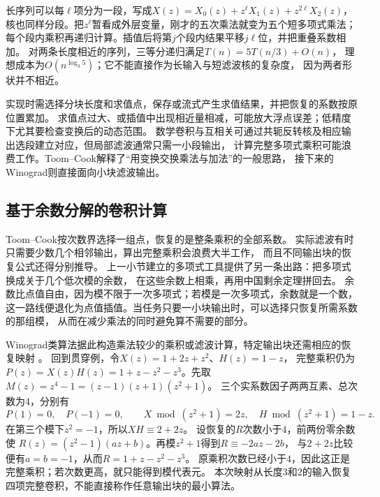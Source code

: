 长序列可以每$\ell$项分为一段，写成$X(z)=X_0(z)+z^\ell X_1(z)+z^{2\ell}X_2(z)$，
核也同样分段。把$z^\ell$暂看成外层变量，刚才的五次乘法就变为五个短多项式乘法；
每个段内乘积再递归计算。插值后将第$j$个段内结果平移$j\ell$位，并把重叠系数相加。
对两条长度相近的序列，三等分递归满足$T(n)=5T(n/3)+O(n)$，
理想成本为$O(n^{\log_3 5})$；它不能直接作为长输入与短滤波核的复杂度，
因为两者形状并不相近。

实现时需选择分块长度和求值点，保存或流式产生求值结果，并把恢复的系数按原位置累加。
求值点过大、或插值中出现相近量相减，可能放大浮点误差；低精度下尤其要检查变换后的动态范围。
数学卷积与互相关可通过共轭反转核及相应输出选段建立对应，但局部滤波通常只需一小段输出，
计算完整多项式乘积可能浪费工作。Toom--Cook解释了“用变换交换乘法与加法”的一般思路，
接下来的Winograd则直接面向小块滤波输出。

\subsection{基于余数分解的卷积计算}\label{sec:signal-analysis-fast-winograd}\label{sec:cnn-winograd}

Toom--Cook按次数界选择一组点，恢复的是整条乘积的全部系数。
实际滤波有时只需要少数几个相邻输出，算出完整乘积会浪费大半工作，
而且不同输出块的恢复公式还得分别推导。
上一小节建立的多项式工具提供了另一条出路：把多项式换成关于几个低次模的余数，
在这些余数上相乘，再用中国剩余定理拼回去。
余数比点值自由，因为模不限于一次多项式；若模是一次多项式，余数就是一个数，
这一路线便退化为点值插值。当任务只要一小块输出时，可以选择只恢复所需系数的那组模，
从而在减少乘法的同时避免算不需要的部分。

Winograd类算法据此构造乘法较少的乘积或滤波计算，特定输出块还需相应的恢复映射
。
回到贯穿例，令$X(z)=1+2z+z^2$、$H(z)=1-z$，
完整乘积仍为$P(z)=X(z)H(z)=1+z-z^2-z^3$。先取
$M(z)=z^4-1=(z-1)(z+1)(z^2+1)$。
三个实系数因子两两互素、总次数为$4$，分别有
\[
  P(1)=0,\quad P(-1)=0,\qquad
  X\bmod(z^2+1)=2z,\quad H\bmod(z^2+1)=1-z.
\]
在第三个模下$z^2=-1$，所以$XH\equiv2+2z$。
设恢复的$R$次数小于$4$，前两份零余数使
$R(z)=(z^2-1)(az+b)$。再模$z^2+1$得到$R\equiv-2az-2b$，
与$2+2z$比较便有$a=b=-1$，从而$R=1+z-z^2-z^3$。
原乘积次数已经小于$4$，因此这正是完整乘积；若次数更高，就只能得到模代表元。
本次映射从长度$3$和$2$的输入恢复四项完整卷积，不能直接称作任意输出块的最小算法。

